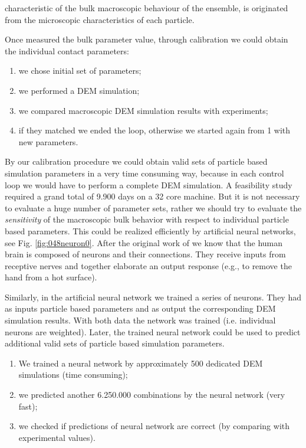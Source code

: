 characteristic of the bulk macroscopic behaviour of the ensemble, is originated from the microscopic
characteristics of each particle.

Once measured the bulk parameter value, through calibration we could obtain the
individual contact parameters:
\begin{enumerate}
\item{we chose initial set of parameters;}
\item{we performed a DEM simulation;}
\item{we compared macroscopic DEM simulation results with experiments;}
\item{if they matched we ended the loop, otherwise we started again from 1 with
new parameters.}
\end{enumerate}
By our calibration procedure we could obtain valid sets of particle based
simulation parameters in a very time consuming way, because in each control loop
we would have to perform a complete \acs{DEM} simulation.
A feasibility study
required a grand total of
9.900 days on a 32 core machine. 
But it is not necessary to evaluate a huge number of parameter sets,
rather we should try to evaluate the \textit{sensitivity} 
of the macroscopic bulk behavior with respect to individual particle based parameters.
This could be realized efficiently by artificial neural networks, see Fig.
\ref{fig:048neuron0}. 
After the original work of \citet{RefWorks:189} we know that the human brain is
composed of neurons and their connections. 
They receive inputs from receptive
nerves and together elaborate an output response (e.g., to remove the hand from
a hot surface).

Similarly, in the artificial neural network we trained a series of neurons.
They had
as inputs particle based parameters and as output the corresponding \acs{DEM}
simulation results.
With both data the network was trained (i.e. individual neurons are
weighted).
Later, the trained neural network could be used to predict additional valid sets
of particle based simulation parameters.

\begin{enumerate}
\item{We trained a neural network by approximately 500 dedicated DEM simulations
(time consuming);}
\item{we predicted another 6.250.000 combinations by the neural network (very
fast);}
\item{we checked if predictions of neural network are correct (by comparing with
experimental  values).}
\end{enumerate}

